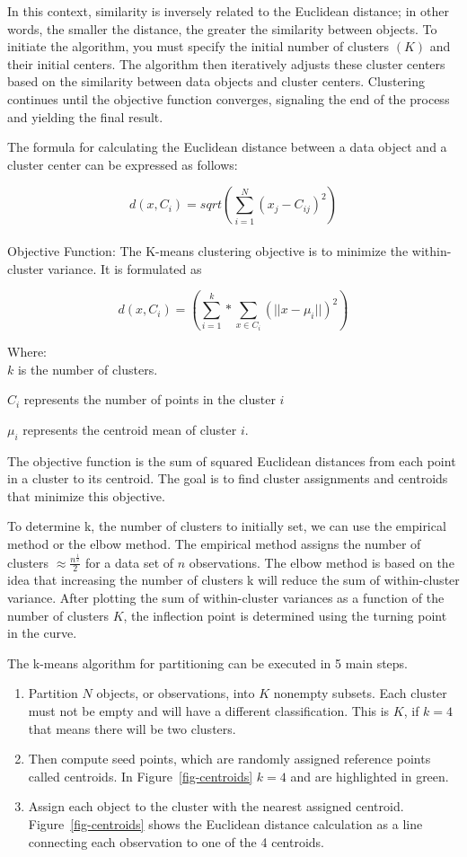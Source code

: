 \documentclass[
  letterpaper,
  DIV=11,
  numbers=noendperiod]{scrreprt}
\begin{document}
In this context, similarity is inversely related to the Euclidean
distance; in other words, the smaller the distance, the greater the
similarity between objects. To initiate the algorithm, you must specify
the initial number of clusters \((K)\) and their initial centers. The
algorithm then iteratively adjusts these cluster centers based on the
similarity between data objects and cluster centers. Clustering
continues until the objective function converges, signaling the end of
the process and yielding the final result.

The formula for calculating the Euclidean distance between a data object
and a cluster center can be expressed as follows:

\[
d(x,C_i)=sqrt(\sum_{i=1}^{N} (x_j−C_{ij})^2)
\]\\
Objective Function: The K-means clustering objective is to minimize the
within-cluster variance. It is formulated as

\[
d(x,C_i)=(\sum_{i=1}^{k}*\sum_{x \in C_i}^{}(||x-\mu_i||)^2)
\]

Where:\\
\(k\) is the number of clusters.

\(C_i\) represents the number of points in the cluster \(i\)

\(\mu_i\) represents the centroid mean of cluster \(i\).

The objective function is the sum of squared Euclidean distances from
each point in a cluster to its centroid. The goal is to find cluster
assignments and centroids that minimize this objective.

To determine k, the number of clusters to initially set, we can use the
empirical method or the elbow method. The empirical method assigns the
number of clusters \(\approx \frac{n^{\frac{1}{2}}}{2}\) for a data set
of \(n\) observations. The elbow method is based on the idea that
increasing the number of clusters k will reduce the sum of
within-cluster variance. After plotting the sum of within-cluster
variances as a function of the number of clusters \(K\), the inflection
point is determined using the turning point in the curve.

The k-means algorithm for partitioning can be executed in 5 main steps.

\begin{enumerate}
\def\labelenumi{\arabic{enumi}.}
\item
  Partition \(N\) objects, or observations, into \(K\) nonempty subsets.
  Each cluster must not be empty and will have a different
  classification. This is \(K\), if \(k=4\) that means there will be two
  clusters.
\item
  Then compute seed points, which are randomly assigned reference points
  called centroids. In Figure~\ref{fig-centroids} \(k=4\) and are
  highlighted in green.
\item
  Assign each object to the cluster with the nearest assigned centroid.
  Figure~\ref{fig-centroids} shows the Euclidean distance calculation as
  a line connecting each observation to one of the 4 centroids.
\end{enumerate}
\end{document}
